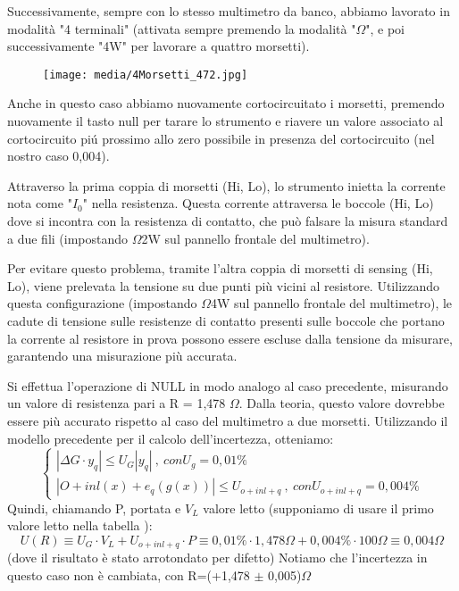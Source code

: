 Successivamente, sempre con lo stesso multimetro da banco, abbiamo lavorato in modalità "4 terminali" (attivata sempre premendo la modalità "$\Omega$", e poi successivamente "4W" per lavorare a quattro morsetti).

\begin{figure}[h]
    \centering
    \texttt{[image: media/4Morsetti\_472.jpg]}
    \label{fig:4morsetti}
\end{figure}
Anche in questo caso abbiamo nuovamente cortocircuitato i morsetti, premendo nuovamente il tasto null per tarare lo strumento e riavere un valore associato al cortocircuito pi\'u prossimo allo zero possibile in presenza del cortocircuito (nel nostro caso 0,004).


Attraverso la prima coppia di morsetti (Hi, Lo), lo strumento inietta la corrente nota come "$I_0$" nella resistenza. Questa corrente attraversa le boccole (Hi, Lo) dove si incontra con la resistenza di contatto, che può falsare la misura standard a due fili (impostando $\Omega$2W sul pannello frontale del multimetro).

Per evitare questo problema, tramite l'altra coppia di morsetti di sensing (Hi, Lo), viene prelevata la tensione su due punti più vicini al resistore. Utilizzando questa configurazione (impostando $\Omega$4W sul pannello frontale del multimetro), le cadute di tensione sulle resistenze di contatto presenti sulle boccole che portano la corrente al resistore in prova possono essere escluse dalla tensione da misurare, garantendo una misurazione più accurata.

Si effettua l'operazione di NULL in modo analogo al caso precedente, misurando un valore di resistenza pari a R = 1,478 $\Omega$. Dalla teoria, questo valore dovrebbe essere più accurato rispetto al caso del multimetro a due morsetti. Utilizzando il modello precedente per il calcolo dell'incertezza, otteniamo:
\begin{equation}
    \left\{ \begin{array}{rcl}
| \Delta G \cdot y_q | \leq U_G |y_q| \ , \ con U_g=0,01\%
\\ | O + inl(x) + e_q(g(x)) | \leq U_{o+inl+q} \ , \ con U_{o+inl+q}=0,004\%
\end{array}\right.
\end{equation}
Quindi, chiamando P, portata e $V_L$ valore letto (supponiamo di usare il primo valore letto nella tabella \label{mult_port}):
\begin{equation}
    U(R) \equiv U_G \cdot V_L + U_{o+inl+q} \cdot P \equiv 0,01\% \cdot 1,478\Omega + 0,004 \% \cdot 100 \Omega \equiv 0,004 \Omega 
\end{equation}
(dove il risultato è stato arrotondato per difetto)
Notiamo che l’incertezza in questo caso non è cambiata, con R=(+1,478 $\pm$ 0,005)$\Omega$



